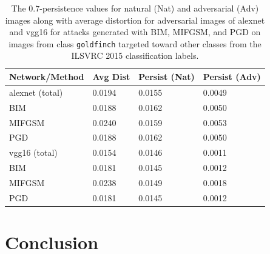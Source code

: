 \begin{table}[ht]
\centering
\caption{The $0.7$-persistence values for natural (Nat) and adversarial (Adv) images along with average distortion for adversarial images of alexnet and vgg16 for attacks generated with BIM, MIFGSM, and PGD on images from class \texttt{goldfinch} targeted toward other classes from the ILSVRC 2015 classification labels.}
\label{TAB:PersistenceAlexVGG}
\begin{tabular}{llll}
\toprule
Network/Method & Avg Dist & Persist (Nat) & Persist (Adv) \\
\midrule
alexnet (total) & 0.0194 & 0.0155 & 0.0049 \\ 
\:\: BIM        & 0.0188 & 0.0162 & 0.0050 \\ 
\:\: MIFGSM     & 0.0240 & 0.0159 & 0.0053 \\ 
\:\: PGD        & 0.0188 & 0.0162 & 0.0050 \\ 
\midrule
vgg16   (total) & 0.0154 & 0.0146 & 0.0011 \\ 
\:\: BIM        & 0.0181 & 0.0145 & 0.0012 \\ 
\:\: MIFGSM     & 0.0238 & 0.0149 & 0.0018 \\ 
\:\: PGD        & 0.0181 & 0.0145 & 0.0012 \\ 
\bottomrule
\end{tabular}
\end{table}



\section{Conclusion}




